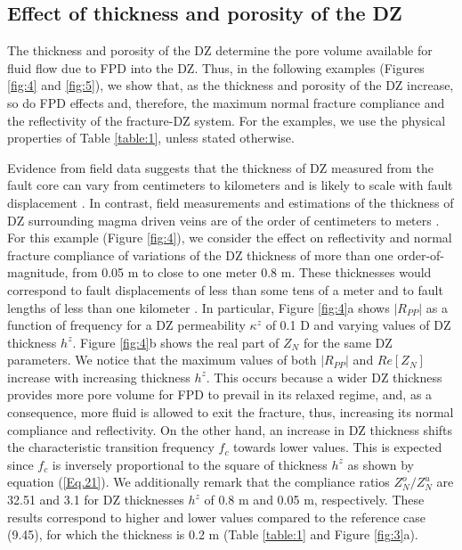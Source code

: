 \documentclass[draft]{agujournal2019}
\begin{document}
\subsection{Effect of thickness and porosity of the DZ}
The thickness and porosity of the DZ determine the pore volume available for fluid flow  due to FPD into the DZ. Thus, in the following examples (Figures \ref{fig:4} and \ref{fig:5}), we show that, as the thickness and porosity of the DZ increase, so do FPD effects and, therefore, the maximum normal fracture compliance and the reflectivity of the fracture-DZ system.
For the examples, we use the physical properties of Table \ref{table:1}, unless stated otherwise.

Evidence from field data suggests that the thickness of  DZ  measured from the fault core can vary from centimeters to kilometers and is likely to scale with fault displacement  \cite{Mitchell2009, Faulkner2011}. In contrast, field measurements and estimations of the thickness of DZ surrounding magma driven veins are of the order of centimeters to meters \cite{Engvik2005}. 
For this example (Figure \ref{fig:4}), we consider the effect on reflectivity and normal fracture compliance of variations of the DZ thickness of more than one order-of-magnitude, from 0.05 m to close to one meter 0.8 m. These thicknesses would  correspond to fault displacements of less than some tens of a meter  \cite{Mitchell2009, Faulkner2011} and to fault lengths of less than one kilometer \cite{Cowie1992}.
In particular,
Figure \ref{fig:4}a shows $|R_{PP}|$ as a function of frequency for a DZ permeability $ \kappa^z $ of 0.1 D and varying values of DZ thickness $h^z$. Figure \ref{fig:4}b shows the real part of $Z_N$ for the same DZ parameters. We notice that the maximum values of both $|R_{PP}|$ and $Re[Z_N]$ increase with increasing thickness $h^z$. This occurs because a wider DZ thickness provides more pore volume for FPD to prevail in its relaxed regime, and, as a consequence, more fluid is allowed to exit the fracture, thus, increasing its normal compliance and reflectivity.
On the other hand, an increase in DZ thickness shifts the characteristic transition frequency $f_c$ towards lower values. This is expected since $f_c$ is inversely proportional to the square of thickness $h^z$ as shown by equation (\ref{Eq.21}).  We additionally remark that the compliance ratios $Z_N^o/Z_N^u$ are 32.51 and 3.1 for DZ thicknesses $h^z$ of 0.8 m and 0.05 m, respectively. These results correspond to higher and lower values compared to the reference case (9.45), for which the thickness is 0.2 m (Table \ref{table:1} and Figure \ref{fig:3}a).
\end{document}
